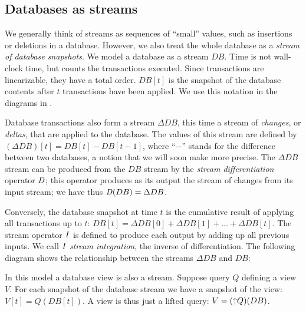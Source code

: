 \subsection{Databases as streams}

We generally think of streams as sequences of ``small'' values, such
as insertions or deletions in a database.  However, we also treat the
whole database as a \emph{stream of database snapshots}.  We model a
database as a stream $DB$.  Time is not wall-clock time, but counts
the transactions executed.  Since transactions are linearizable, they
have a total order.  $DB[t]$ is the snapshot of the database contents
after $t$ transactions have been applied.  We use this notation in the
diagrams in .

Database transactions also form a stream $\Delta DB$, this time a
stream of \emph{changes}, or \emph{deltas}, that are applied to the
database.  The values of this stream are defined by $(\Delta DB)[t] =
DB[t] - DB[t-1]$, where ``$-$'' stands for the difference between two
databases, a notion that we will soon make more precise.  The $\Delta
DB$ stream can be produced from the $DB$ stream by the \emph{stream
differentiation} operator $\mathit{D}$; this operator produces as its output
the stream of changes from its input stream; we have thus $\mathit{D}(DB) =
\Delta DB$.

Conversely, the database snapshot at time $t$ is the cumulative result
of applying all transactions up to $t$: $DB[t] = \Delta DB[0] + \Delta
DB[1] + \ldots + \Delta DB[t]$.  The stream operator $\mathit{I}$ is defined
to produce each output by adding up all previous inputs.  We call $\mathit{I}$
\emph{stream integration}, the inverse of differentiation.  The
following diagram shows the relationship between the streams $\Delta
DB$ and $DB$:
\begin{center}
\end{center}

In this model a database view is also a stream.  Suppose query $Q$
defining a view $V$.  For each snapshot of the database stream we have
a snapshot of the view: $V[t] = Q(DB[t])$.  A view is thus just a
lifted query: $V = ({\uparrow}Q)(DB)$.

